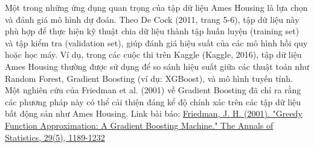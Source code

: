 Một trong những ứng dụng quan trọng của tập dữ liệu Ames Housing là lựa chọn và đánh giá mô hình dự đoán. Theo De Cock (2011, trang 5-6), tập dữ liệu này phù hợp để thực hiện kỹ thuật chia dữ liệu thành tập huấn luyện (training set) và tập kiểm tra (validation set), giúp đánh giá hiệu suất của các mô hình hồi quy hoặc học máy. Ví dụ, trong các cuộc thi trên Kaggle (Kaggle, 2016), tập dữ liệu Ames Housing thường được sử dụng để so sánh hiệu suất giữa các thuật toán như Random Forest, Gradient Boosting (ví dụ: XGBoost), và mô hình tuyến tính. Một nghiên cứu của Friedman et al. (2001) về Gradient Boosting đã chỉ ra rằng các phương pháp này có thể cải thiện đáng kể độ chính xác trên các tập dữ liệu bất động sản như Ames Housing.
Link bài báo:  \href{https://www.jstor.org/stable/2674076}{Friedman, J. H. (2001). "Greedy Function Approximation: A Gradient Boosting Machine." The Annals of Statistics, 29(5), 1189-1232}